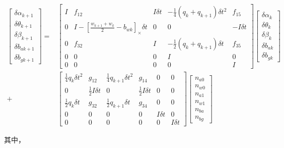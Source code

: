 \documentclass[12pt,a4paper]{article}
\begin{document}
\begin{equation}
\label{equ:preinte_iter_complete}
\begin{aligned}
\begin{bmatrix}
\delta \alpha_{k+1} \\
\delta \theta_{k+1} \\
\delta \beta_{k+1} \\
\delta b_{a{}{k+1}} \\
\delta b_{g{}{k+1}}
\end{bmatrix} =&
\begin{bmatrix}
I & f_{12} & I\delta t & -\frac{1}{4}(q_{k}+q_{k+1})\delta t^{2} & f_{15} \\
0 & I-[\frac{w_{k+1}+w_{k}}{2}-b_{wk}]_{\times } \delta t & 0 & 0 & -I\delta t \\
0 & f_{32} & I & -\frac{1}{2}(q_{k}+q_{k+1})\delta t & f_{35} \\
0 & 0 & 0 & I & 0 \\
0 & 0 & 0 & 0 & I
\end{bmatrix}
\begin{bmatrix}
\delta \alpha_{k} \\
\delta \theta_{k} \\
\delta \beta_{k} \\
\delta b_{a{}{k}} \\
\delta b_{g{}{k}}
\end{bmatrix} \\
+&
\begin{bmatrix}
\frac{1}{4}q_{k}\delta t^{2} & g_{12} & \frac{1}{4}q_{k+1}\delta t^{2} & g_{14} & 0 & 0 \\
0 & \frac{1}{2}I\delta t & 0 & \frac{1}{2}I\delta t & 0 & 0 \\
\frac{1}{2}q_{k}\delta t & g_{32} & \frac{1}{2}q_{k+1}\delta t & g_{34} & 0 & 0 \\
0 & 0 & 0 & 0 & I\delta t & 0 \\
0 & 0 & 0 & 0 & 0 & I\delta t
\end{bmatrix}
\begin{bmatrix}
n_{a0}\\
n_{w0}\\
n_{a1}\\
n_{w1}\\
n_{ba}\\
n_{bg}
\end{bmatrix}
\end{aligned}
\end{equation}

其中，
\end{document}

